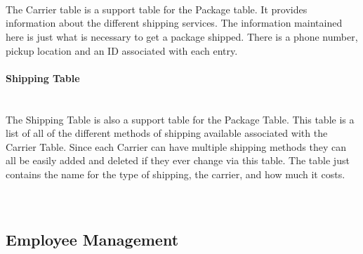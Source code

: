\documentclass{report}
\begin{document}
        \\
        \\
        \\
        The Carrier table is a support table for the Package table. It provides information about the different
        shipping services. The information maintained here is just what is necessary to get a package shipped.
        There is a phone number, pickup location and an ID associated with each entry.
        \\
        \\
        {\bf Shipping Table}\\
        \\
        \\
        The Shipping Table is also a support table for the Package Table. This table is a list of all of the
        different methods of shipping available associated with the Carrier Table. Since each Carrier can
        have multiple shipping methods they can all be easily added and deleted if they ever change via
        this table. The table just contains the name for the type of shipping, the carrier, and how much
        it costs.\\
        \\
        \\
        \subsection{Employee Management}
\end{document}
